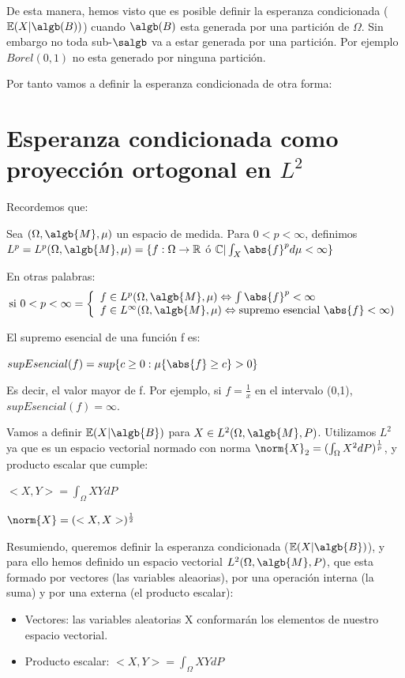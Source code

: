 \documentclass{apuntes}
\begin{document}
De esta manera, hemos visto que es posible definir la esperanza condicionada ($\mathbb{E}(X|\algb(B))$) cuando $\algb(B)$ esta generada por una partición de $\Omega$. Sin embargo no toda sub-$\salgb$ va a estar generada por una partición. Por ejemplo $Borel(0,1)$ no esta generado por ninguna partición.

Por tanto vamos a definir la esperanza condicionada de otra forma:

\section{Esperanza condicionada como proyección ortogonal en $L^2$}
Recordemos que:

Sea $(\Omega, \algb{M}, \mu)$ un espacio de medida. Para $0<p<\infty$, definimos $L^p=L^p(\Omega,\algb{M},\mu)=\{f:\Omega\rightarrow \mathbb{R}$ ó $\mathbb{C} | \int_X \abs{f}^p d\mu < \infty\}$

En otras palabras:
$$
\text{si } 0<p<\infty =
  \left\lbrace
  \begin{array}{l}
     f\in L^p(\Omega,\algb{M},\mu) \Leftrightarrow \int \abs{f}^p < \infty \\
     f\in L^{\infty}(\Omega,\algb{M},\mu) \Leftrightarrow \text{supremo esencial } \abs{f} < \infty) \\
  \end{array}
  \right.
$$

El supremo esencial de una función f es:

$supEsencial(f)=sup\{c\geq0:\mu\{\abs{f}\geq c\}>0\}$

Es decir, el valor mayor de f. Por ejemplo, si $f=\frac{1}{x}$ en el intervalo (0,1), $supEsencial(f)=\infty$.

Vamos a definir $\mathbb{E}(X|\algb{B})$ para $X\in  L^2(\Omega,\algb{M},P)$. Utilizamos $L^2$ ya que es un espacio vectorial normado con norma $\norm{X}_2 = (\int_\Omega {X^2 dP})^{\frac{1}{p}}$, y producto escalar que cumple:

$<X,Y> = \int_{\Omega}XYdP$

$\norm{X}=(<X,X>)^{\frac{1}{2}}$

Resumiendo, queremos definir la esperanza condicionada ($\mathbb{E}(X|\algb{B})$), y para ello hemos definido un espacio vectorial $L^2(\Omega,\algb{M},P)$, que esta formado por vectores (las variables aleaorias), por una operación interna (la suma) y por una externa (el producto escalar):
\begin{itemize}
\item Vectores: las variables aleatorias X conformarán los elementos de nuestro espacio vectorial.
\item Producto escalar: $<X,Y> = \int_{\Omega}XYdP$
\end{itemize}
\end{document}
